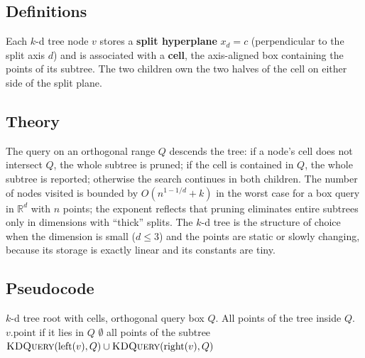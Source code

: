 \subsection{Definitions}

\begin{definition}\label{def:kd_cell}
  Each $k$-d tree node $v$ stores a \textbf{split hyperplane} $x_d = c$
  (perpendicular to the split axis $d$) and is associated with a
  \textbf{cell}, the axis-aligned box containing the points of its subtree.
  The two children own the two halves of the cell on either side of the
  split plane.
\end{definition}

\subsection{Theory}

The query on an orthogonal range $Q$ descends the tree: if a node's cell
does not intersect $Q$, the whole subtree is pruned; if the cell is
contained in $Q$, the whole subtree is reported; otherwise the search
continues in both children. The number of nodes visited is bounded by
$O(n^{1-1/d} + k)$ in the worst case for a box query in $\mathbb{R}^d$
with $n$ points; the exponent reflects that pruning eliminates entire
subtrees only in dimensions with ``thick'' splits. The $k$-d tree is the
structure of choice when the dimension is small ($d \le 3$) and the points
are static or slowly changing, because its storage is exactly linear and
its constants are tiny.

\subsection{Pseudocode}

\begin{algorithm}[htbp]
\caption{Orthogonal Range Query in a $k$-d Tree}
\label{alg:kd_range_query}
\begin{algorithmic}[1]
\Require $k$-d tree root with cells, orthogonal query box $Q$.
\Ensure All points of the tree inside $Q$.
   \State \Return $v.\text{point}$ if it lies in $Q$
  \EndIf
   \State \Return $\emptyset$ \EndIf
   \State \Return all points of the subtree \EndIf
  \State \Return $\textsc{KDQuery}(\text{left}(v), Q) \cup \textsc{KDQuery}(\text{right}(v), Q)$
\EndFunction
\end{algorithmic}
\end{algorithm}

